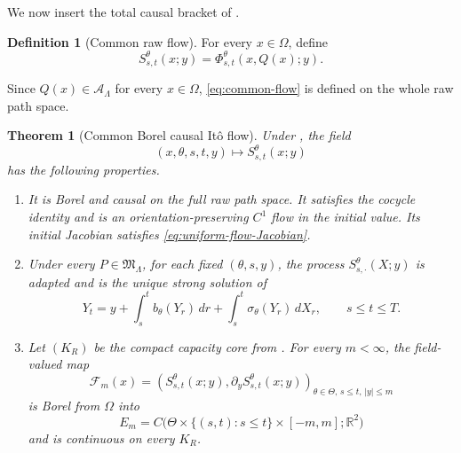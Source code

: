 \documentclass[11pt,reqno]{amsart}
\theoremstyle{plain}
\newtheorem{theorem}{Theorem}[section]
\theoremstyle{definition}
\newtheorem{definition}[definition]{Definition}
\newcommand{\R}{\mathbb R}
\newcommand{\cA}{\mathcal A}
\newcommand{\dd}{\,d}
\begin{document}
We now insert the total causal bracket of .

\begin{definition}[Common raw flow]\label{def:common-flow}
For every \(x\in\Omega\), define
\begin{equation}\label{eq:common-flow}
  S_{s,t}^\theta(x;y)
  =\Phi_{s,t}^\theta(x,Q(x);y).
\end{equation}
\end{definition}

Since \(Q(x)\in\cA_\Lambda\) for every \(x\in\Omega\),
\eqref{eq:common-flow} is defined on the whole raw path space.

\begin{theorem}[Common Borel causal It\^o flow]\label{thm:common-flow}
Under , the field
\[
  (x,\theta,s,t,y)\longmapsto S_{s,t}^\theta(x;y)
\]
has the following properties.
\begin{enumerate}[leftmargin=2.2em,label=(\roman*)]
  \item It is Borel and causal on the full raw path space.  It satisfies the
  cocycle identity and is an orientation-preserving \(C^1\) flow in the
  initial value.  Its initial Jacobian satisfies
  \eqref{eq:uniform-flow-Jacobian}.

  \item Under every \(P\in\mathfrak M_\Lambda\), for each fixed
  \((\theta,s,y)\), the process \(S_{s,\cdot}^\theta(X;y)\) is adapted and
  is the unique strong solution of
  \begin{equation}\label{eq:modelwise-SDE}
    Y_t
    =y+\int_s^t b_\theta(Y_r)\dd r
       +\int_s^t\sigma_\theta(Y_r)\dd X_r,
    \qquad s\le t\le T.
  \end{equation}

  \item Let \((K_R)\) be the compact capacity core from
  .  For every \(m<\infty\), the field-valued map
  \begin{equation}\label{eq:flow-Jacobian-field}
    \mathscr F_m(x)
    =
    \left(
      S_{s,t}^\theta(x;y),
      \partial_yS_{s,t}^\theta(x;y)
    \right)_{\theta\in\Theta,\,s\le t,\,|y|\le m}
  \end{equation}
  is Borel from \(\Omega\) into
  \begin{equation}\label{eq:field-space}
    E_m
    =C\bigl(\Theta\times\{(s,t):s\le t\}\times[-m,m];\R^2\bigr)
  \end{equation}
  and is continuous on every \(K_R\).
\end{enumerate}
\end{theorem}
\end{document}
